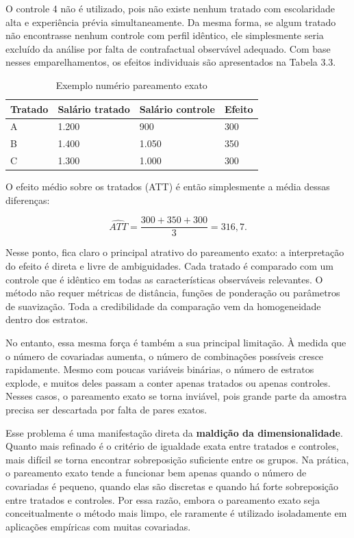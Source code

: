 O controle 4 não é utilizado, pois não existe nenhum tratado com escolaridade alta e experiência prévia simultaneamente. Da mesma forma, se algum tratado não encontrasse nenhum controle com perfil idêntico, ele simplesmente seria excluído da análise por falta de contrafactual observável adequado. Com base nesses emparelhamentos, os efeitos individuais são apresentados na Tabela 3.3.

\begin{table}[H]
    \centering
    \begin{tabular}{llll}
       Tratado  & Salário tratado & Salário controle & Efeito  \\\midrule
        A & 1.200 &   900    & 300 \\
        B & 1.400   & 1.050 &  350 \\
        C & 1.300  &  1.000  & 300  \\
        \bottomrule
    \end{tabular}
    \caption{Exemplo numério pareamento exato}
    \label{tab:placeholder}
\end{table}

O efeito médio sobre os tratados (ATT) é então simplesmente a média dessas diferenças:

$$
\widehat{ATT} = \frac{300 + 350 + 300}{3} = 316,7.
$$

Nesse ponto, fica claro o principal atrativo do pareamento exato: a interpretação do efeito é direta e livre de ambiguidades. Cada tratado é comparado com um controle que é idêntico em todas as características observáveis relevantes. O método não requer métricas de distância, funções de ponderação ou parâmetros de suavização. Toda a credibilidade da comparação vem da homogeneidade dentro dos estratos.

No entanto, essa mesma força é também a sua principal limitação. À medida que o número de covariadas aumenta, o número de combinações possíveis cresce rapidamente. Mesmo com poucas variáveis binárias, o número de estratos explode, e muitos deles passam a conter apenas tratados ou apenas controles. Nesses casos, o pareamento exato se torna inviável, pois grande parte da amostra precisa ser descartada por falta de pares exatos.

Esse problema é uma manifestação direta da \textbf{maldição da dimensionalidade}. Quanto mais refinado é o critério de igualdade exata entre tratados e controles, mais difícil se torna encontrar sobreposição suficiente entre os grupos. Na prática, o pareamento exato tende a funcionar bem apenas quando o número de covariadas é pequeno, quando elas são discretas e quando há forte sobreposição entre tratados e controles. Por essa razão, embora o pareamento exato seja conceitualmente o método mais limpo, ele raramente é utilizado isoladamente em aplicações empíricas com muitas covariadas.

